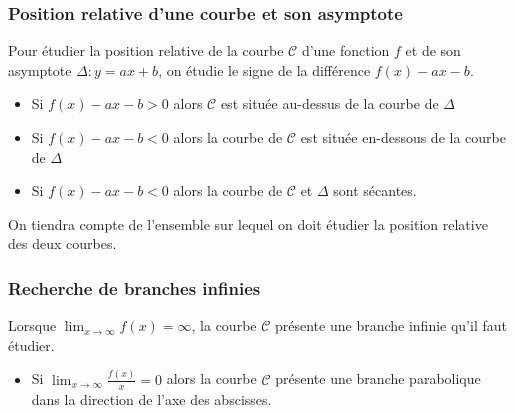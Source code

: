 \begin{example}
\subsubsection*{Position relative d'une courbe et son asymptote}
Pour étudier la position relative de la  courbe $\mathcal{C} $ d'une fonction $ f $ et  de  son asymptote $ \Delta : y=ax+b $, on étudie le signe de la différence $ f(x)-ax-b$.
\begin{itemize}
\item  Si $ f(x)-ax-b > 0$ alors  $ \mathcal{C}  $ est  située  au-dessus de la courbe de $ \Delta $ 
\item  Si $ f(x)-ax-b< 0$ alors la courbe de $\mathcal{C}$ est  située  en-dessous de la courbe de $\Delta$ 
\item  Si $ f(x)-ax-b< 0$ alors la courbe de $\mathcal{C}$ et  $\Delta$  sont sécantes.
\end{itemize}
On tiendra compte de l'ensemble sur lequel on doit étudier la position relative des deux courbes.
\subsubsection{Recherche de branches infinies}
Lorsque  $\displaystyle \lim_{x \to \infty}f(x)=\infty  $, la courbe $ \mathcal{C} $ présente une branche infinie qu'il faut étudier.
\begin{itemize}
\item    Si $\displaystyle \lim_{x \to \infty}\frac{f(x)}{x}=0  $  alors la courbe $ \mathcal{C} $ présente une branche parabolique dans la direction  de  l'axe des abscisses.


\end{itemize}
\end{example}
